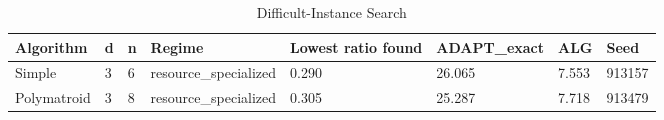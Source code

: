 \begin{table}[t]
\centering
\small
\caption{Difficult-Instance Search}
\begin{tabular}{llllllll}
\toprule
Algorithm & d & n & Regime & Lowest ratio found & ADAPT_exact & ALG & Seed \\
\midrule
Simple & 3 & 6 & resource\_specialized & 0.290 & 26.065 & 7.553 & 913157 \\
Polymatroid & 3 & 8 & resource\_specialized & 0.305 & 25.287 & 7.718 & 913479 \\
\bottomrule
\end{tabular}
\end{table}
